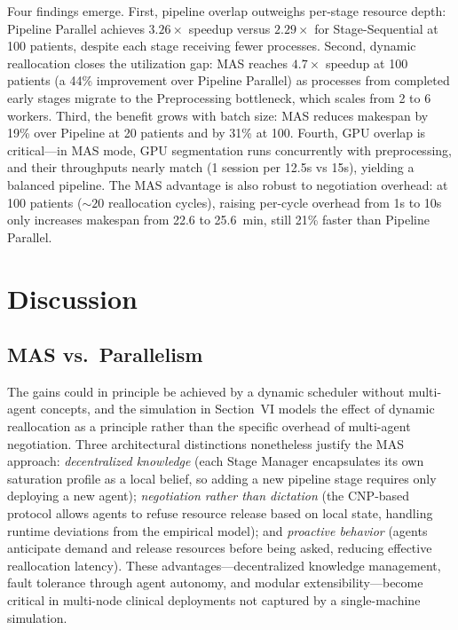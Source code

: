 \documentclass[conference]{IEEEtran}
\begin{document}
Four findings emerge. First, pipeline overlap outweighs per-stage resource depth: Pipeline Parallel achieves $3.26\times$ speedup versus $2.29\times$ for Stage-Sequential at 100 patients, despite each stage receiving fewer processes. Second, dynamic reallocation closes the utilization gap: MAS reaches $4.7\times$ speedup at 100 patients (a 44\% improvement over Pipeline Parallel) as processes from completed early stages migrate to the Preprocessing bottleneck, which scales from 2 to 6 workers. Third, the benefit grows with batch size: MAS reduces makespan by 19\% over Pipeline at 20 patients and by 31\% at 100. Fourth, GPU overlap is critical---in MAS mode, GPU segmentation runs concurrently with preprocessing, and their throughputs nearly match (1 session per 12.5s vs 15s), yielding a balanced pipeline. The MAS advantage is also robust to negotiation overhead: at 100 patients (${\sim}20$ reallocation cycles), raising per-cycle overhead from 1s to 10s only increases makespan from 22.6 to 25.6~min, still 21\% faster than Pipeline Parallel.

\section{Discussion}

\subsection{MAS vs.\ Parallelism}

The gains could in principle be achieved by a dynamic scheduler without multi-agent concepts, and the simulation in Section~VI models the effect of dynamic reallocation as a principle rather than the specific overhead of multi-agent negotiation. Three architectural distinctions nonetheless justify the MAS approach: \textit{decentralized knowledge} (each Stage Manager encapsulates its own saturation profile as a local belief, so adding a new pipeline stage requires only deploying a new agent); \textit{negotiation rather than dictation} (the CNP-based protocol allows agents to refuse resource release based on local state, handling runtime deviations from the empirical model); and \textit{proactive behavior} (agents anticipate demand and release resources before being asked, reducing effective reallocation latency). These advantages---decentralized knowledge management, fault tolerance through agent autonomy, and modular extensibility---become critical in multi-node clinical deployments not captured by a single-machine simulation.
\end{document}
